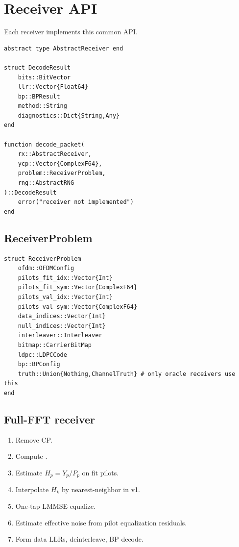 \documentclass[11pt]{article}
\newcommand{\code}[1]{\texttt{\detokenize{#1}}}
\begin{document}
\clearpage
\section{Receiver API}

Each receiver implements this common API.

\begin{lstlisting}
abstract type AbstractReceiver end

struct DecodeResult
    bits::BitVector
    llr::Vector{Float64}
    bp::BPResult
    method::String
    diagnostics::Dict{String,Any}
end

function decode_packet(
    rx::AbstractReceiver,
    ycp::Vector{ComplexF64},
    problem::ReceiverProblem,
    rng::AbstractRNG
)::DecodeResult
    error("receiver not implemented")
end
\end{lstlisting}

\subsection{ReceiverProblem}

\begin{lstlisting}
struct ReceiverProblem
    ofdm::OFDMConfig
    pilots_fit_idx::Vector{Int}
    pilots_fit_sym::Vector{ComplexF64}
    pilots_val_idx::Vector{Int}
    pilots_val_sym::Vector{ComplexF64}
    data_indices::Vector{Int}
    null_indices::Vector{Int}
    interleaver::Interleaver
    bitmap::CarrierBitMap
    ldpc::LDPCCode
    bp::BPConfig
    truth::Union{Nothing,ChannelTruth} # only oracle receivers use this
end
\end{lstlisting}

\subsection{Full-FFT receiver}

\begin{enumerate}
\item Remove CP.
\item Compute \code{Yfull=fft(y)/sqrt(N)}.
\item Estimate $H_p=Y_p/P_p$ on fit pilots.
\item Interpolate $H_k$ by nearest-neighbor in v1.
\item One-tap LMMSE equalize.
\item Estimate effective noise from pilot equalization residuals.
\item Form data LLRs, deinterleave, BP decode.
\end{enumerate}
\end{document}
